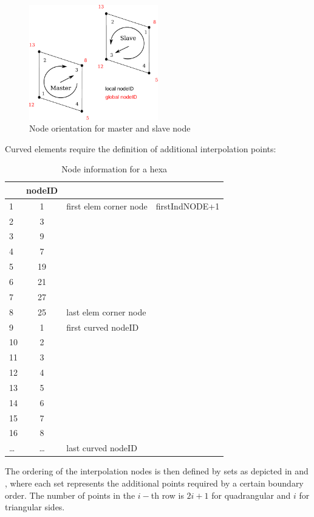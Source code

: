 \begin{figure}
\centering
\includegraphics[width=0.5\textwidth]{masterslave.pdf}
\caption{Node orientation for master and slave node}
\label{labelname}
\end{figure}

Curved elements require the definition of additional interpolation points:
\begin{table}[h!]
\centering
\begin{tabular}{|l|c||l|l|} \hline
   & nodeID & &\\ \hline
1 & 1 & first elem corner node & firstIndNODE+1 \\ 
2 & 3 &  &  \\ 
3 & 9 &  &  \\ 
4 & 7 &  &  \\
5 & 19 &  &  \\ 
6 & 21 &  &  \\ 
7 & 27 &  &  \\ 
8 & 25 & last elem corner node &  \\ \hline
9 & 1 & first curved nodeID &  \\
10 & 2 &  &  \\ 
11 & 3 &  &  \\ 
12 & 4 &  &  \\ 
13 & 5 &  &  \\ 
14 & 6 &  &  \\ 
15 & 7 &  &  \\ 
16 & 8 &  &  \\ 
\ldots & \ldots & last curved nodeID &  \\ \hline
\end{tabular}
\caption{Node information for a hexa}
\end{table}

The ordering of the interpolation nodes is then defined by sets as depicted in  and , where each set represents the additional points required by a certain boundary order. The number of points in the $i-$th row is $2i+1$ for quadrangular and $i$ for triangular sides.  

